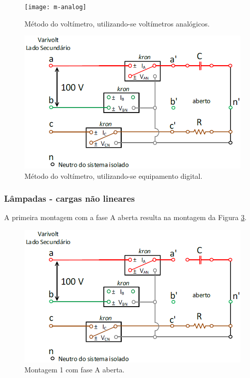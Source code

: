 \documentclass[a4paper,12pt,oneside,openany,table,xcdraw]{article}
\begin{document}
\vspace{0.2cm}
\begin{figure}[H]
\centering
\texttt{[image: m-analog]}
\caption{Método do voltímetro, utilizando-se voltímetros analógicos.}
\label{m1:analogico}
\end{figure}

\vspace{2cm}
\begin{figure}[H]
\centering
\includegraphics[width=13cm]{m1-circuito}
\caption{Método do voltímetro, utilizando-se equipamento digital.}
\label{m1:esquema}
\end{figure}

\newpage
\subsubsection{Lâmpadas - cargas não lineares}
A primeira montagem com a fase A aberta resulta na montagem da Figura \ref{m2:esquema}.
\vspace{0.3cm}
\begin{figure}[H]
\centering
\includegraphics[width=13cm]{m2-circuito}
\caption{Montagem 1 com fase A aberta.}
\label{m2:esquema}
\end{figure}
\vspace{0.1cm}
\end{document}
